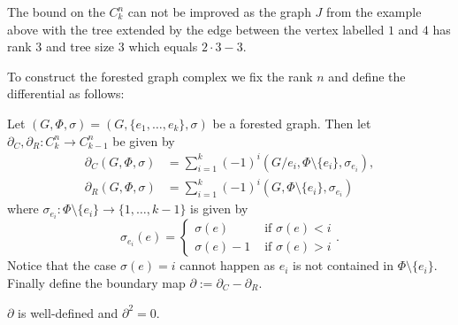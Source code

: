 \begin{remark}
	The bound on the $C_{k}^{n}$ can not be improved as the graph $J$ from the example above with the tree extended by the edge between the vertex labelled $1$ and $4$ has rank $3$ and
	tree size $3$ which equals $2 \cdot 3 -3$.
\end{remark}

To construct the forested graph complex we fix the rank $n$ and define the differential as follows:
\begin{definition}
	Let $(G,\Phi,\sigma) = (G, \{e_1,\ldots,e_{k}\},\sigma)$ be a forested graph. Then let $\partial_{C}, \partial_{R}: C_{k}^{n} \to C_{k-1}^{n}$ be given by
	\begin{align*}
		\partial_{C}(G,\Phi,\sigma) &= \sum_{i = 1}^{k} (-1)^{i} (G / e_{i}, \Phi \setminus \{e_{i}\}, \sigma_{e_{i}}),\\
		\partial _{R}(G,\Phi,\sigma) &= \sum_{i = 1}^{k} (-1)^{i} (G,\Phi \setminus \{e_{i}\}, \sigma_{e_{i}}) 
	\end{align*}
	where $\sigma_{e_{i}}: \Phi \setminus \{e_{i}\} \to \{1,\ldots,k-1\}$ is given by
	\[
		\sigma_{e_{i}}(e) = \begin{cases}
			\sigma(e) & \text{ if }\sigma(e) < i\\
			\sigma(e) - 1 & \text{ if } \sigma(e) > i
		\end{cases}
	.\]
	Notice that the case $\sigma(e) = i$ cannot happen as $e_{i}$ is not contained in $\Phi \setminus \{e_{i}\}$. 
	Finally define the boundary map $\partial := \partial_{C} - \partial_{R}$.
\end{definition}

\begin{proposition}
	$\partial$ is well-defined and $\partial^2 = 0$.
\end{proposition}

